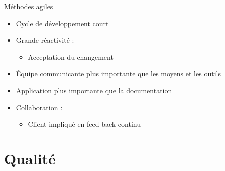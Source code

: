 \documentclass[14pt]{beamer}
\begin{document}
\begin{framentitle}{Méthodes agiles}
    \begin{itemize}
        \item Cycle de développement court
        \item Grande réactivité :
            \begin{itemize}
                \item Acceptation du changement
            \end{itemize}
        \item Équipe communicante plus importante que
            les moyens et les outils
        \item Application plus importante que
            la documentation
        \item Collaboration :
            \begin{itemize}
                \item Client impliqué en feed-back continu
            \end{itemize}
    \end{itemize}
\end{framentitle}

\section{Qualité}
\end{document}
